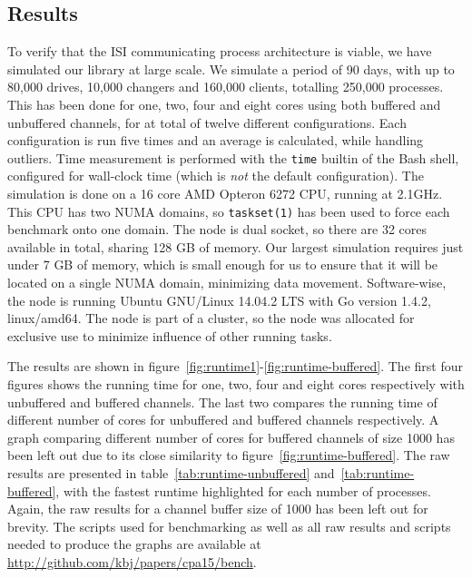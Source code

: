 \subsection{Results}
\label{sec:results}

To verify that the ISI communicating process architecture is viable, we have
simulated our library at large scale. We simulate a period of 90 days, with up
to 80,000 drives, 10,000 changers and 160,000 clients, totalling 250,000
processes. This has been done for one, two, four and eight cores using both
buffered and unbuffered channels, for at total of twelve different
configurations. Each configuration is run five times and an average is
calculated, while handling outliers. Time measurement is performed with the
\verb|time| builtin of the Bash shell, configured for wall-clock time (which is
\emph{not} the default configuration). The
simulation is done on a 16 core AMD Opteron 6272 CPU, running at 2.1GHz. This
CPU has two NUMA domains, so \verb|taskset(1)| has been used to force each
benchmark onto one domain. The node is dual socket, so there are 32 cores
available in total, sharing 128 GB of memory. Our largest simulation requires
just under 7 GB of memory, which is small enough for us to ensure that it will
be located on a single NUMA domain, minimizing data movement. Software-wise,
the node is running Ubuntu GNU/Linux 14.04.2 LTS with Go version 1.4.2,
linux/amd64. The node is part of a cluster, so the node was
allocated for exclusive use to minimize influence of other running tasks.

The results are shown in
figure~\ref{fig:runtime1}-\ref{fig:runtime-buffered}. The first four figures
shows the running time for one, two, four and eight cores respectively with
unbuffered and buffered channels. The last two compares the running time of
different number of cores for unbuffered and buffered channels respectively. A
graph comparing different number of cores for buffered channels of size 1000
has been left out due to its close similarity to
figure~\ref{fig:runtime-buffered}. The raw results are presented in
table~\ref{tab:runtime-unbuffered} and~\ref{tab:runtime-buffered}, with the
fastest runtime highlighted for each number of processes. Again, the
raw results for a channel buffer size of 1000 has been left out for
brevity. The scripts used for benchmarking as well as all raw results and
scripts needed to produce the graphs are available at
\url{http://github.com/kbj/papers/cpa15/bench}.

